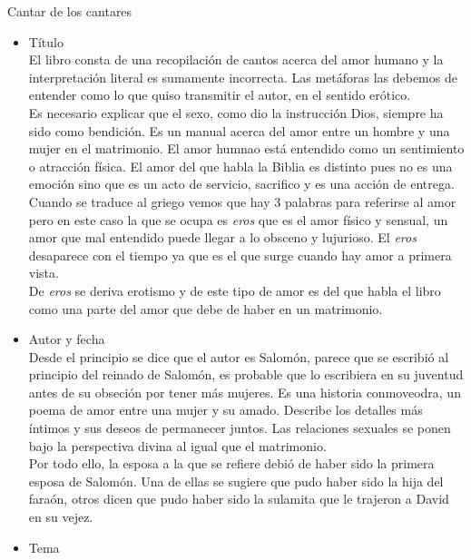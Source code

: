 %
%
\begin{section}{Cantar de los cantares}
	\begin{itemize}
		\item Título\\
			El libro consta de una recopilación de cantos acerca del amor humano y la interpretación literal es sumamente incorrecta. Las metáforas las debemos de entender como lo que quiso transmitir el autor, en el sentido erótico.\\
			Es necesario explicar que el sexo, como dio la instrucción Dios, siempre ha sido como bendición. Es un manual acerca del amor entre un hombre y una mujer en el matrimonio. El amor humnao está entendido como un sentimiento o atracción física. El amor del que habla la Biblia es distinto pues no es una emoción sino que es un acto de servicio, sacrifico y es una acción de entrega.\\
			Cuando se traduce al griego vemos que hay 3 palabras para referirse al amor pero en este caso la que se ocupa es \textit{eros} que es el amor físico y sensual, un amor que mal entendido puede llegar a lo obsceno y lujurioso. El \textit{eros} desaparece con el tiempo ya que es el que surge cuando hay amor a primera vista.\\
			De \textit{eros} se deriva erotismo y de este tipo de amor es del que habla el libro como una parte del amor que debe de haber en un matrimonio. 
		\item Autor y fecha\\
			Desde el principio se dice que el autor es Salomón, parece que se escribió al principio del reinado de Salomón, es probable que lo escribiera en su juventud antes de su obseción por tener más mujeres. Es una historia conmoveodra, un poema de amor entre una mujer y su amado. Describe los detalles más íntimos y sus deseos de permanecer juntos. Las relaciones sexuales se ponen bajo la perspectiva divina al igual que el matrimonio.\\
			Por todo ello, la esposa a la que se refiere debió de haber sido la primera esposa de Salomón. Una de ellas se sugiere que pudo haber sido la hija del faraón, otros dicen que pudo haber sido la sulamita que le trajeron a David en su vejez. \\
		\item Tema\\

\end{itemize}
\end{section}

